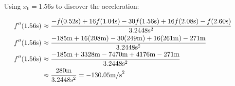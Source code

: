 	Using $x_{0} = 1.56\text{s}$ to discover the acceleration:

	\begin{align}
		f''(1.56\text{s}) &\approx \frac{-f(0.52\text{s})+16f(1.04\text{s})-30f(1.56\text{s})+16f(2.08\text{s})-f(2.60\text{s})}{3.2448\text{s}^{2}}& \\
		f''(1.56\text{s}) &\approx \frac{-185\text{m}+16(208\text{m})-30(249\text{m})+16(261\text{m})-271\text{m}}{3.2448\text{s}^{2}}& \notag \\
		f''(1.56\text{s}) &\approx \frac{-185\text{m}+3328\text{m}-7470\text{m}+4176\text{m}-271\text{m}}{3.2448\text{s}^{2}}& \notag \\
		&\approx \frac{280\text{m}}{3.2448\text{s}^{2}} = -130.05\text{m/s}^{2}&
	\end{align}

